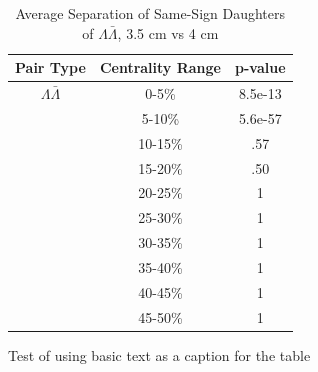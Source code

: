 \begin{table}
\caption{Average Separation of Same-Sign Daughters of $\Lambda\bar{\Lambda}$, 3.5 cm vs 4 cm} \label{tab:AvgSepProtDaughters35cmVs4cm}
\begin{center}
\begin{tabular}{| c | c | c |}
  \hline                       
  Pair Type & Centrality Range & p-value \\
   \hline
  $\Lambda\bar{\Lambda}$ &  0-5\% & 8.5e-13 \\
   & 5-10\% & 5.6e-57 \\
   & 10-15\% & .57 \\
   & 15-20\% & .50 \\
   & 20-25\% & 1 \\
   & 25-30\% & 1 \\
   & 30-35\% & 1 \\
   & 35-40\% & 1 \\
   & 40-45\% & 1 \\
   & 45-50\% & 1 \\
  \hline  
\end{tabular}
Test of using basic text as a caption for the table
\end{center}
\end{table}

